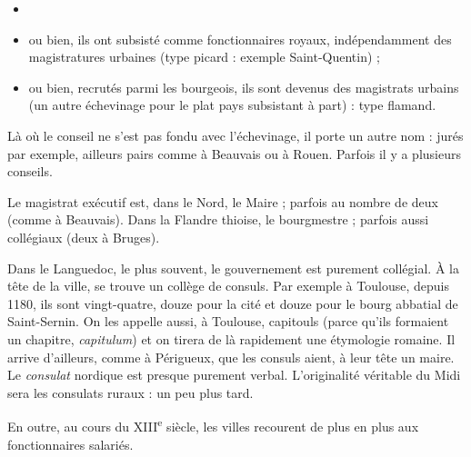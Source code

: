 \documentclass[french,twoside]{book} %
\begin{document}
\begin{itemize}[itemsep=0pt,]
\item[] \hspace{-1.5em}{\bfseries Leur destin dans les villes a été double :}
\item ou bien, ils ont subsisté comme fonctionnaires royaux, indépendamment des magistratures urbaines (type picard : exemple Saint-Quentin) ;
\item ou bien, recrutés parmi les bourgeois, ils sont devenus des magistrats urbains (un autre échevinage pour le plat pays subsistant à part) : type flamand.
\end{itemize}
\noindent Là où le conseil ne s’est pas fondu avec l’échevinage, il porte un autre nom : jurés par exemple, ailleurs pairs comme à Beauvais ou à Rouen. Parfois il y a plusieurs conseils.\par
Le magistrat exécutif est, dans le Nord, le Maire ; parfois au nombre de deux (comme à Beauvais). Dans la Flandre thioise, le bourgmestre ; parfois aussi collégiaux (deux à Bruges).\par
Dans le Languedoc, le plus souvent, le gouvernement est purement collégial. À la tête de la ville, se trouve un collège de consuls. Par exemple à Toulouse, depuis 1180, ils sont vingt-quatre, douze pour la cité et douze pour le bourg abbatial de Saint-Sernin. On les appelle aussi, à Toulouse, capitouls (parce qu’ils formaient un chapitre, {\itshape capitulum}) et on tirera de là rapidement une étymologie romaine. Il arrive d’ailleurs, comme à Périgueux, que les  
\label{p76} consuls aient, à leur tête un maire. Le \emph{consulat} nordique est presque purement verbal. L’originalité véritable du Midi sera les consulats ruraux : un peu plus tard.\par
En outre, au cours du XIII\textsuperscript{e} siècle, les villes recourent de plus en plus aux fonctionnaires salariés.\par
\end{document}
